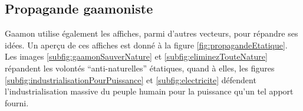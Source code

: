 \subsection{Propagande gaamoniste}
Gaamon utilise également les affiches, parmi d'autres vecteurs, pour répandre ses idées. Un aperçu de ces affiches est donné à la figure \ref{fig:propagandeEtatique}. Les images \ref{subfig:gaamonSauverNature} et \ref{subfig:eliminezTouteNature} répandent les volontés \enquote{anti-naturelles} étatiques, quand à elles, les figures \ref{subfig:industrialisationPourPuissance} et \ref{subfig:electricite} défendent l'industrialisation massive du peuple humain pour la puissance qu'un tel apport fourni.

\begin{figure}[ht!]
	\hspace*{.04\linewidth}
	

\end{figure}
